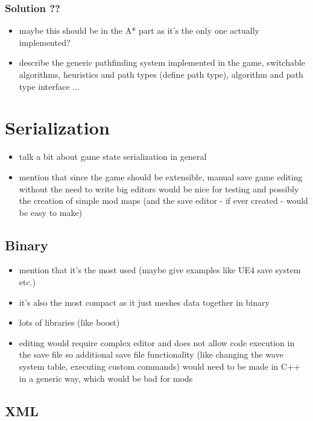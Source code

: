 \subsubsection{Solution ??}

\begin{itemize}
    \item maybe this should be in the A* part as it's the only one actually implemented?
    \item describe the generic pathfinding system implemented in the game, switchable
	    algorithms, heuristics and path types (define path type),
	    algorithm and path type interface ...
\end{itemize}

\section{Serialization}

\begin{itemize}
    \item talk a bit about game state serialization in general
    \item mention that since the game should be extensible, manual save game
	    editing without the need to write big editors would be nice
	    for testing and possibly the creation of simple mod maps
	    (and the save editor - if ever created - would be easy to make)
\end{itemize}

\subsection{Binary}

\begin{itemize}
    \item mention that it's the most used
	    (maybe give examples like UE4 save system etc.)
    \item it's also the most compact as it just meshes data together in binary
    \item lots of libraries (like boost)
    \item editing would require complex editor and does not allow code execution in the
	    save file so additional save file functionality (like changing the wave
	    system table, executing custom commands) would need to be made in C++
	    in a generic way, which would be bad for mods
\end{itemize}

\subsection{XML}

